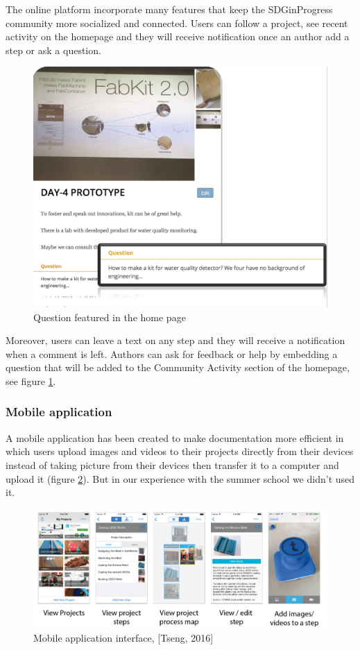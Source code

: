 The online platform incorporate many features that keep the SDGinProgress community more socialized and connected. Users can follow a project, see recent activity on the homepage and they will receive notification once an author add a step or ask a question.
\begin{figure}[H]
	\centering
	\includegraphics[scale=.4]{./images/img-commentquestion1.png}
	\caption{Question featured in the home page} 
	\label{img-commentquestion}
\end{figure}

Moreover, users can leave a text on any step and they will receive a notification when a comment is left. Authors can ask for feedback or help by embedding a question that will be added to the Community Activity section of the homepage, see figure \ref{img-commentquestion}.
\subsubsection{Mobile application}
A mobile application has been created to make documentation more efficient in which users upload images and videos to their projects directly from their devices instead of taking picture from their devices then transfer it to a computer and upload it (figure \ref{img-mobileapp}). But in our experience with the summer school we didn't used it.
\begin{figure}[H]
	\centering
	\includegraphics[scale=.5]{./images/img-mobileapp.png}
	\caption{Mobile application interface, [Tseng, 2016]} 
	\label{img-mobileapp}
\end{figure}



